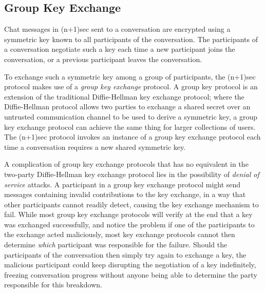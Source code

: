\documentclass{article}
\begin{document}




\subsection{Group Key Exchange}
\label{sec:cryptography/group-key-exchange}

Chat messages in (n+1)sec sent to a conversation are encrypted using a symmetric key known to all participants of the conversation.
The participants of a conversation negotiate such a key each time a new participant joins the conversation, or a previous participant leaves the conversation.

To exchange such a symmetric key among a group of participants, the (n+1)sec protocol makes use of a \emph{group key exchange} protocol.
A group key protocol is an extension of the traditional Diffie-Hellman key exchange protocol; where the Diffie-Hellman protocol allows two parties to exchange a shared secret over an untrusted communication channel to be used to derive a symmetric key, a group key exchange protocol can achieve the same thing for larger collections of users.
The (n+1)sec protocol invokes an instance of a group key exchange protocol each time a conversation requires a new shared symmetric key.

A complication of group key exchange protocols that has no equivalent in the two-party Diffie-Hellman key exchange protocol lies in the possibility of \emph{denial of service} attacks.
A participant in a group key exchange protocol might send messages containing invalid contributions to the key exchange, in a way that other participants cannot readily detect, causing the key exchange mechanism to fail.
While most group key exchange protocols will verify at the end that a key was exchanged successfully, and notice the problem if one of the participants to the exchange acted maliciously, most key exchange protocols cannot then determine \emph{which} participant was responsible for the failure.
Should the participants of the conversation then simply try again to exchange a key, the malicious participant could keep disrupting the negotiation of a key indefinitely, freezing conversation progress without anyone being able to determine the party responsible for this breakdown.
\end{document}
